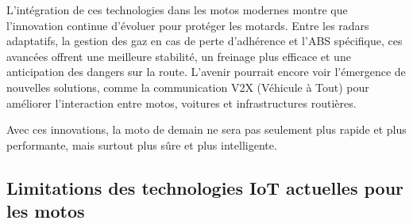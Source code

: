\documentclass{article}
\begin{document}

L’intégration de ces technologies dans les motos modernes montre que l’innovation continue d’évoluer pour protéger les motards. Entre les radars adaptatifs, la gestion des gaz en cas de perte d’adhérence et l’ABS spécifique, ces avancées offrent une meilleure stabilité, un freinage plus efficace et une anticipation des dangers sur la route. L’avenir pourrait encore voir l’émergence de nouvelles solutions, comme la communication V2X (Véhicule à Tout) pour améliorer l’interaction entre motos, voitures et infrastructures routières.

Avec ces innovations, la moto de demain ne sera pas seulement plus rapide et plus performante, mais surtout plus sûre et plus intelligente. 

\subsection{Limitations des technologies IoT actuelles pour les motos}
\end{document}
